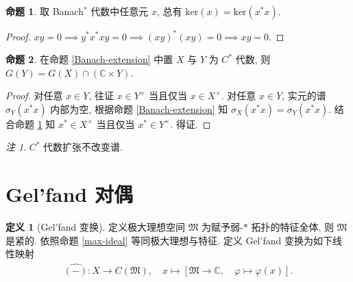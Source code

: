 \documentclass{MainStyle}
\theoremstyle{definition}
\theoremstyle{definition}
\theoremstyle{definition}
\newtheorem{definition}{定义}
\theoremstyle{definition}
\newtheorem{proposition}{命题}
\theoremstyle{definition}
\theoremstyle{definition}
\theoremstyle{definition}
\theoremstyle{remark}
\newtheorem{remark}{注}
\theoremstyle{remark}
\begin{document}
\begin{proposition}\label{kerx=kerx*x}
    取 Banach$^\ast$ 代数中任意元 $x$, 总有 $\mathrm{ker}(x)=\mathrm{ker}(x^\ast x)$.
    \begin{proof}
        $xy=0\implies y^\ast x^\ast xy=0\implies (xy)^\ast(xy) =0\implies xy=0$.
    \end{proof}
\end{proposition}

\begin{proposition}
    在命题 \ref{Banach-extension} 中置 $X$ 与 $Y$ 为 $C^\ast$ 代数, 则 $G(Y)=G(X)\cap (\mathbb C\times Y)$.
    \begin{proof}
        对任意 $x\in Y$, 往证 $x\in Y^\times$ 当且仅当 $x\in X^\times$. 对任意 $x\in Y$, 实元的谱 $\sigma_Y(x^\ast x)$ 内部为空, 根据命题 \ref{Banach-extension} 知 $\sigma_X(x^\ast x)=\sigma_Y(x^\ast x)$. 结合命题 \ref{kerx=kerx*x} 知 $x^\ast \in X^\times $ 当且仅当 $x^\ast \in Y^\times$. 得证.
    \end{proof}
\end{proposition}

\begin{remark}
    $C^\ast$ 代数扩张不改变谱.
\end{remark}

\section{Gel'fand 对偶}

\begin{definition}[Gel'fand 变换]\label{Gel'fand}
    定义极大理想空间 $\mathfrak M$ 为赋予弱-$\ast$ 拓扑的特征全体, 则 $\mathfrak M$ 是紧的. 依照命题 \ref{max-ideal} 等同极大理想与特征. 定义 Gel'fand 变换为如下线性映射
    \begin{align*}
        \widehat{(-)}:X\to C(\mathfrak M),\quad x\mapsto [\mathfrak M\to \mathbb C,\quad \varphi \mapsto \varphi (x)].
    \end{align*}
\end{definition}
\end{document}
